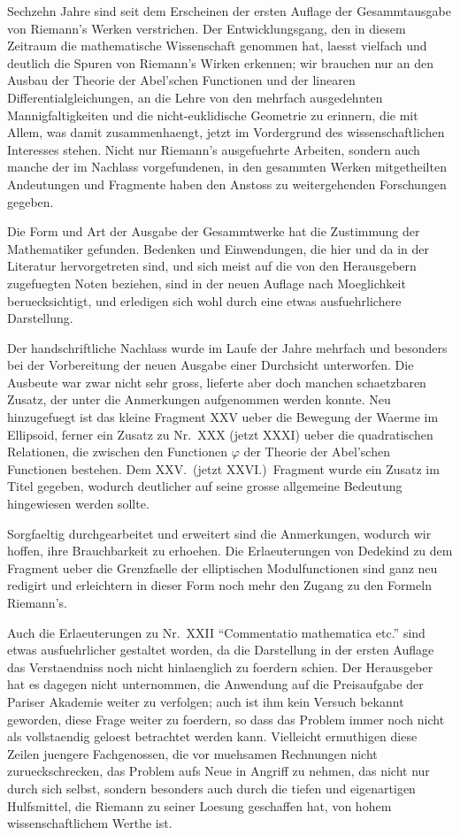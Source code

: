 \documentclass[12pt,a4paper]{book}
\theoremstyle{definition}
\theoremstyle{remark}
\begin{document}
Sechzehn Jahre sind seit dem Erscheinen der ersten Auflage der Gesammtausgabe von Riemann's Werken verstrichen. Der Entwicklungsgang, den in diesem Zeitraum die mathematische Wissenschaft genommen hat, laesst vielfach und deutlich die Spuren von Riemann's Wirken erkennen; wir brauchen nur an den Ausbau der Theorie der Abel'schen Functionen und der linearen Differentialgleichungen, an die Lehre von den mehrfach ausgedehnten Mannigfaltigkeiten und die nicht-euklidische Geometrie zu erinnern, die mit Allem, was damit zusammenhaengt, jetzt im Vordergrund des wissenschaftlichen Interesses stehen. Nicht nur Riemann's ausgefuehrte Arbeiten, sondern auch manche der im Nachlass vorgefundenen, in den gesammten Werken mitgetheilten Andeutungen und Fragmente haben den Anstoss zu weitergehenden Forschungen gegeben.

Die Form und Art der Ausgabe der Gesammtwerke hat die Zustimmung der Mathematiker gefunden. Bedenken und Einwendungen, die hier und da in der Literatur hervorgetreten sind, und sich meist auf die von den Herausgebern zugefuegten Noten beziehen, sind in der neuen Auflage nach Moeglichkeit beruecksichtigt, und erledigen sich wohl durch eine etwas ausfuehrlichere Darstellung.

Der handschriftliche Nachlass wurde im Laufe der Jahre mehrfach und besonders bei der Vorbereitung der neuen Ausgabe einer Durchsicht unterworfen. Die Ausbeute war zwar nicht sehr gross, lieferte aber doch manchen schaetzbaren Zusatz, der unter die Anmerkungen aufgenommen werden konnte. Neu hinzugefuegt ist das kleine Fragment XXV ueber die Bewegung der Waerme im Ellipsoid, ferner ein Zusatz zu Nr.\ XXX (jetzt XXXI) ueber die quadratischen Relationen, die zwischen den Functionen $\varphi$ der Theorie der Abel'schen Functionen bestehen. Dem XXV.\ (jetzt XXVI.)\ Fragment wurde ein Zusatz im Titel gegeben, wodurch deutlicher auf seine grosse allgemeine Bedeutung hingewiesen werden sollte.

Sorgfaeltig durchgearbeitet und erweitert sind die Anmerkungen, wodurch wir hoffen, ihre Brauchbarkeit zu erhoehen. Die Erlaeuterungen von Dedekind zu dem Fragment ueber die Grenzfaelle der elliptischen Modulfunctionen sind ganz neu redigirt und erleichtern in dieser Form noch mehr den Zugang zu den Formeln Riemann's.

Auch die Erlaeuterungen zu Nr.\ XXII ``Commentatio mathematica etc.'' sind etwas ausfuehrlicher gestaltet worden, da die Darstellung in der ersten Auflage das Verstaendniss noch nicht hinlaenglich zu foerdern schien. Der Herausgeber hat es dagegen nicht unternommen, die Anwendung auf die Preisaufgabe der Pariser Akademie weiter zu verfolgen; auch ist ihm kein Versuch bekannt geworden, diese Frage weiter zu foerdern, so dass das Problem immer noch nicht als vollstaendig geloest betrachtet werden kann. Vielleicht ermuthigen diese Zeilen juengere Fachgenossen, die vor muehsamen Rechnungen nicht zurueckschrecken, das Problem aufs Neue in Angriff zu nehmen, das nicht nur durch sich selbst, sondern besonders auch durch die tiefen und eigenartigen Hulfsmittel, die Riemann zu seiner Loesung geschaffen hat, von hohem wissenschaftlichem Werthe ist.
\end{document}
